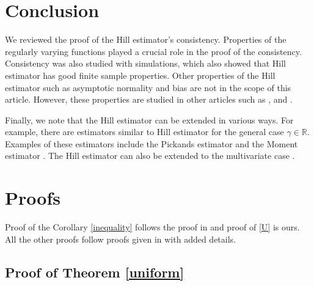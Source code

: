 \documentclass[english,12pt,a4paper,pdftex,sci,utf8]{aaltothesis} %
\begin{document}
\clearpage
\section{Conclusion}
\label{conclusion}

We reviewed the proof of the Hill estimator's consistency. Properties of the regularly varying functions played a crucial role in the proof of the consistency. Consistency was also studied with simulations, which also showed that Hill estimator has good finite sample properties. Other properties of the Hill estimator such as asymptotic normality and bias are not in the scope of this article. However, these properties are studied in other articles such as \cite{peng}, \cite{hausler} and \cite{haanResnick}.

Finally, we note that the Hill estimator can be extended in various ways. For example, there are estimators similar to Hill estimator for the general case $\gamma \in \mathbb{R}$. Examples of these estimators include the Pickands estimator \cite{pickands} and the Moment estimator \cite{dekkers}. The Hill estimator can also be extended to the multivariate case \cite{ilmonen}.

\clearpage





\thesisbibliography





\clearpage

\thesisappendix


\section{Proofs}

Proof of the Corollary \ref{inequality} follows the proof in \cite{resnick} and proof of \ref{U} is ours. All the other proofs follow proofs given in \cite{deHaan} with added details.

\label{proofs}
\subsection{Proof of Theorem \ref{uniform}}
\end{document}
